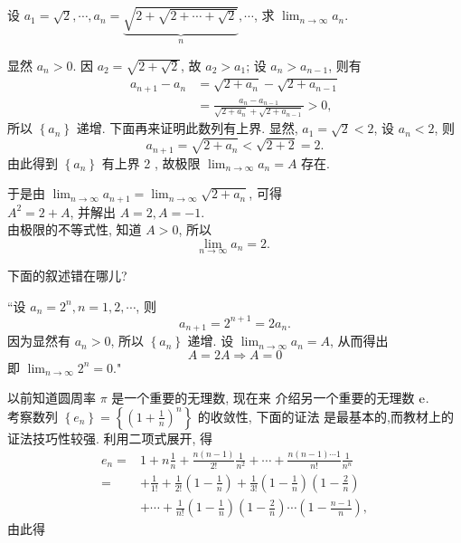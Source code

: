 \documentclass[t,12pt,mathserif] {beamer}
\begin{document}
\begin{frame}{}%
\begin{ex}
    设 $a_1=\sqrt{2}, \cdots, a_n=\underbrace{\sqrt{2+\sqrt{2+\cdots+\sqrt{2}}}}_n, \cdots$, 求 $\lim _{n \rightarrow \infty} a_n$. 
\end{ex}
\jie 显然 $a_n>0$. 因 $a_2=\sqrt{2+\sqrt{2}}$, 故 $a_2>a_1$; 设 $a_n>a_{n-1}$, 则有
$$
\begin{aligned}
a_{n+1}-a_n & =\sqrt{2+a_n}-\sqrt{2+a_{n-1}} \\
& =\frac{a_n-a_{n-1}}{\sqrt{2+a_n}+\sqrt{2+a_{n-1}}}>0,
\end{aligned}
$$
所以 $\left\{a_n\right\}$ 递增. 下面再来证明此数列有上界.
显然, $a_1=\sqrt{2}<2$, 设 $a_n<2$, 则
$$
a_{n+1}=\sqrt{2+a_n}<\sqrt{2+2}=2 .
$$
由此得到 $\left\{a_n\right\}$ 有上界 2 , 故极限 $\lim _{n \rightarrow \infty} a_n=A$ 存在.

\end{frame}
\begin{frame}{}%
  于是由 $\lim _{n \rightarrow \infty} a_{n+1}=\lim _{n \rightarrow \infty} \sqrt{2+a_n}$, 可得\\
$A^2=2+A$, 并解出 $A=2, A=-1$.\\
由极限的不等式性, 知道 $A>0$, 所以
$$
\lim _{n \rightarrow \infty} a_n=2 \text {. }
$$  
\begin{ex}
下面的叙述错在哪儿?
\end{ex}
“设 $a_n=2^n, n=1,2, \cdots$, 则
$$
a_{n+1}=2^{n+1}=2 a_n .
$$
因为显然有 $a_n>0$, 所以 $\left\{a_n\right\}$ 递增. 设 $\lim _{n \rightarrow \infty} a_n=A$, 从而得出
$$
A=2 A \Rightarrow A=0
$$
即 $\lim _{n \rightarrow \infty} 2^n=0$."

\end{frame}

\begin{frame}{}%
 以前知道圆周率 $\pi$ 是一个重要的无理数, 现在来 介绍另一个重要的无理数 $ \mathrm{e} $.   \\
 考察数列 $\left\{e_n\right\}=\left\{\left(1+\frac{1}{n}\right)^n\right\}$ 的收敛性, 下面的证法 是最基本的,而教材上的证法技巧性较强. 利用二项式展开, 得
 \baselineskip
 \bena
$$
\begin{aligned}
e_n= & 1+n \frac{1}{n}+\frac{n(n-1)}{2 !} \frac{1}{n^2}+\cdots+\frac{n(n-1) \cdots 1}{n !} \frac{1}{n^n} \\
= & +\frac{1}{1 !}+\frac{1}{2 !}\left(1-\frac{1}{n}\right)+\frac{1}{3 !}\left(1-\frac{1}{n}\right)\left(1-\frac{2}{n}\right) \\
& +\cdots+\frac{1}{n !}\left(1-\frac{1}{n}\right)\left(1-\frac{2}{n}\right) \cdots\left(1-\frac{n-1}{n}\right),
\end{aligned}
$$
\eena
 由此得
\end{frame}
\end{document}
